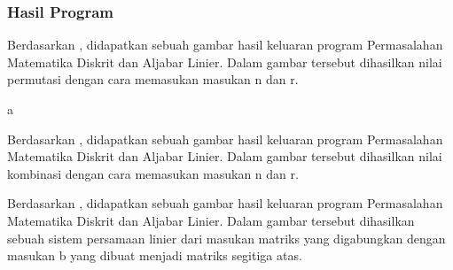 \documentclass[../main.tex]{subfiles}
\begin{document}
    \subsubsection{Hasil Program}
    \begin{indentlevel0}
        \ilz{}Berdasarkan , didapatkan sebuah gambar hasil keluaran program Permasalahan Matematika Diskrit dan Aljabar Linier. Dalam gambar tersebut dihasilkan nilai permutasi dengan cara memasukan masukan n dan r.
    \end{indentlevel0}
    \newpage
    {\color{White}a}\vspace{-1.6ex}
    \begin{indentlevel0}
        \ilz{}Berdasarkan , didapatkan sebuah gambar hasil keluaran program Permasalahan Matematika Diskrit dan Aljabar Linier. Dalam gambar tersebut dihasilkan nilai kombinasi dengan cara memasukan masukan n dan r.
    \end{indentlevel0}
    \begin{indentlevel0}
        \ilz{}Berdasarkan , didapatkan sebuah gambar hasil keluaran program Permasalahan Matematika Diskrit dan Aljabar Linier. Dalam gambar tersebut dihasilkan sebuah sistem persamaan linier dari masukan matriks yang digabungkan dengan masukan b yang dibuat menjadi matriks segitiga atas.
    \end{indentlevel0}
\end{document}
